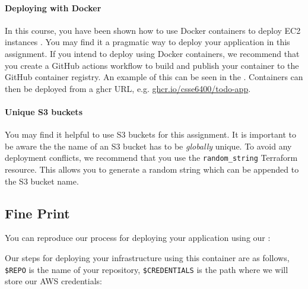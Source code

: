 \documentclass{csse4400}
\begin{document}
\paragraph{Deploying with Docker}
In this course,
you have been shown how to use Docker containers to deploy EC2 instances \cite{prac-week5}.
You may find it a pragmatic way to deploy your application in this assignment.
If you intend to deploy using Docker containers,
we recommend that you create a GitHub actions workflow
to build and publish your container to the GitHub container registry.
An example of this can be seen in the .
Containers can then be deployed from a ghcr URL, e.g. \url{ghcr.io/csse6400/todo-app}.


\paragraph{Unique S3 buckets}
You may find it helpful to use S3 buckets for this assignment.
It is important to be aware the the name of an S3 bucket has to be \textsl{globally} unique.
To avoid any deployment conflicts,
we recommend that you use the \texttt{random\_string} Terraform resource.
This allows you to generate a random string which can be appended to the S3 bucket name.




\subsection{Fine Print}
You can reproduce our process for deploying your application using our :

\noindent
Our steps for deploying your infrastructure using this container are as follows,
\texttt{\$REPO} is the name of your repository,
\texttt{\$CREDENTIALS} is the path where we will store our AWS credentials:
\end{document}
